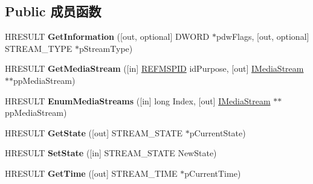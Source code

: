 \subsection*{Public 成员函数}
\begin{DoxyCompactItemize}
\item 
\mbox{\label{interface_i_multi_media_stream_ac53ed7b775311103c52eef674cc7217f}} 
H\+R\+E\+S\+U\+LT {\bfseries Get\+Information} (\mbox{[}out, optional\mbox{]} D\+W\+O\+RD $\ast$pdw\+Flags, \mbox{[}out, optional\mbox{]} S\+T\+R\+E\+A\+M\+\_\+\+T\+Y\+PE $\ast$p\+Stream\+Type)
\item 
\mbox{\label{interface_i_multi_media_stream_a2109e3d35de140c4fcc2d38cde7ff58d}} 
H\+R\+E\+S\+U\+LT {\bfseries Get\+Media\+Stream} (\mbox{[}in\mbox{]} \hyperlink{struct___g_u_i_d}{R\+E\+F\+M\+S\+P\+ID} id\+Purpose, \mbox{[}out\mbox{]} \hyperlink{interface_i_media_stream}{I\+Media\+Stream} $\ast$$\ast$pp\+Media\+Stream)
\item 
\mbox{\label{interface_i_multi_media_stream_a31f1428a78f14be82c6c4d395c6d009b}} 
H\+R\+E\+S\+U\+LT {\bfseries Enum\+Media\+Streams} (\mbox{[}in\mbox{]} long Index, \mbox{[}out\mbox{]} \hyperlink{interface_i_media_stream}{I\+Media\+Stream} $\ast$$\ast$pp\+Media\+Stream)
\item 
\mbox{\label{interface_i_multi_media_stream_a7855d38e39aeee83d833cdac9edd5495}} 
H\+R\+E\+S\+U\+LT {\bfseries Get\+State} (\mbox{[}out\mbox{]} S\+T\+R\+E\+A\+M\+\_\+\+S\+T\+A\+TE $\ast$p\+Current\+State)
\item 
\mbox{\label{interface_i_multi_media_stream_a8242fcb573b3a2d8461b909edd7e7995}} 
H\+R\+E\+S\+U\+LT {\bfseries Set\+State} (\mbox{[}in\mbox{]} S\+T\+R\+E\+A\+M\+\_\+\+S\+T\+A\+TE New\+State)
\item 
\mbox{\label{interface_i_multi_media_stream_a5bc720f02b433173c032b9fda0dea432}} 
H\+R\+E\+S\+U\+LT {\bfseries Get\+Time} (\mbox{[}out\mbox{]} S\+T\+R\+E\+A\+M\+\_\+\+T\+I\+ME $\ast$p\+Current\+Time)
\item 
\mbox{\label{interface_i_multi_media_stream_ad9ac20e79919e0e833840567865aa6f3}} 

\end{DoxyCompactItemize}
